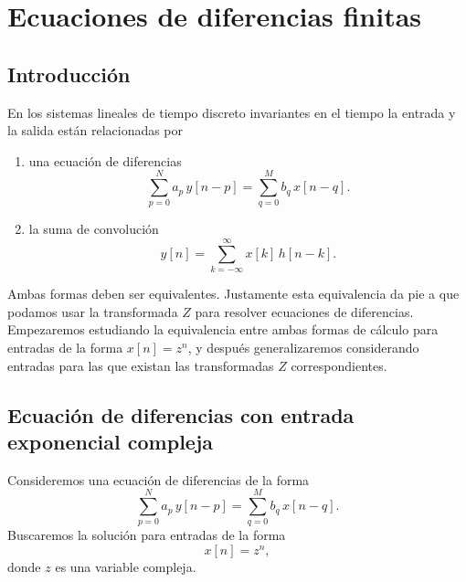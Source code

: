 \chapter{Ecuaciones de diferencias finitas}

\section{Introducci\'{o}n}

En los sistemas lineales de tiempo discreto invariantes en el tiempo la entrada y la salida est\'{a}n 
relacionadas por 
\begin{enumerate}
   \item  una ecuaci\'{o}n de diferencias 
      \begin{equation}
           \sum_{p=0}^{N}a_{p} \, y\left[ n-p\right] =\sum_{q=0}^{M}b_{q} \, x\left[ n-q\right]. 
           \label{eqdiferencia}
      \end{equation}

   \item   la suma de convoluci\'{o}n
        \begin{equation}
                y[n] = \sum_{k=-\infty}^{\infty} x[k] \, h[n - k].
        \end{equation}
        
\end{enumerate}
Ambas formas deben ser equivalentes. Justamente esta equivalencia da pie a que podamos usar la
transformada $Z$ para resolver ecuaciones de diferencias. Empezaremos estudiando la equivalencia entre 
ambas formas de c\'{a}lculo para entradas de la forma $x[n] = z^{n}$, y despu\'{e}s generalizaremos 
considerando entradas para las que existan las transformadas $Z$ correspondientes.

\section{Ecuaci\'{o}n de diferencias con entrada exponencial compleja}

Consideremos una ecuaci\'{o}n de diferencias de la forma 
\begin{equation}
   \sum_{p=0}^{N}a_{p} \, y\left[ n-p\right] =\sum_{q=0}^{M}b_{q} \, x\left[ n-q\right].
\end{equation}
Buscaremos la soluci\'{o}n para entradas de la forma 
\begin{equation}
x[n]=z^n ,
\end{equation}
donde $z$ es una variable compleja.

